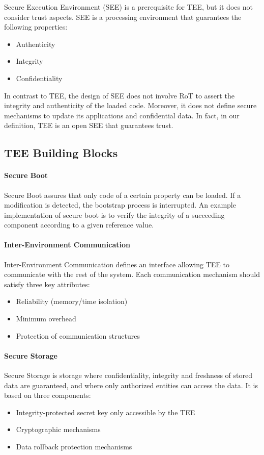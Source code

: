 \documentclass{article}
\begin{document}
Secure Execution Environment (SEE) is a prerequisite for TEE, but it does not consider trust aspects. SEE is a processing environment that guarantees the following properties: \begin{itemize}
\item Authenticity
\item Integrity
\item Confidentiality
\end{itemize} 
In contrast to TEE, the design of SEE does not involve RoT to assert the integrity and authenticity of the loaded code. Moreover, it does not define secure mechanisms to update its applications and confidential data. In fact, in our definition, TEE is an open SEE that guarantees trust.

\subsection{TEE Building Blocks}

\paragraph{Secure Boot}

Secure Boot assures that only code of a certain property can be loaded. If a modification is detected, the bootstrap process is interrupted. An example implementation of secure boot is to verify the integrity of a succeeding component according to a given reference value.

\paragraph{Inter-Environment Communication}

Inter-Environment Communication defines an interface allowing TEE to communicate with the rest of the system. Each communication mechanism should satisfy three key attributes: \begin{itemize}
\item Reliability (memory/time isolation)
\item Minimum overhead
\item Protection of communication structures
\end{itemize}

\paragraph{Secure Storage}

Secure Storage is storage where confidentiality, integrity and freshness of stored data are guaranteed, and where only authorized entities can access the data. It is based on three components: \begin{itemize}
\item Integrity-protected secret key only accessible by the TEE
\item Cryptographic mechanisms
\item Data rollback protection mechanisms
\end{itemize}
\end{document}
